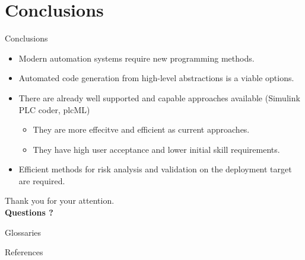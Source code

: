 \documentclass[18pt]{beamer}
\begin{document}
\section{Conclusions}
\begin{frame}{Conclusions}

\begin{itemize}
    \item Modern automation systems require new programming methods.
    \pause
    \item Automated code generation from high-level abstractions is a viable options.
    \pause
    \item There are already well supported and capable approaches available (Simulink PLC coder, plcML)
    \begin{itemize}
        \item They are more effecitve and efficient as current approaches.
        \item They have high user acceptance and lower initial skill requirements.
    \end{itemize}
    \pause
    \item Efficient methods for risk analysis and validation on the deployment target are required.
\end{itemize}
\end{frame}

\begin{frame}
\vfill
\centering
{\LARGE Thank you for your attention.}\\
\vspace{1cm}
{\Large \textbf{Questions ?}}
\vfill
\end{frame}

\appendix
\beginbackup

\nocite{*}

\begin{frame}[allowframebreaks]{Glossaries}
\printglossaries
\end{frame}

\begin{frame}[allowframebreaks]{References}
\printbibliography
\end{frame}

\backupend
\end{document}

